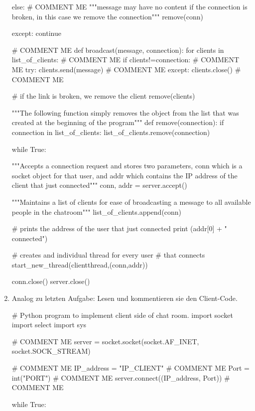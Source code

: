 \documentclass[paper=a4,fontsize=11pt]{scrartcl}%
\numberwithin{equation}{section}
\begin{document}
\begin{enumerate}
\begin{python}
                else: # COMMENT ME
                    """message may have no content if the connection
                    is broken, in this case we remove the connection"""
                    remove(conn)
 
            except:
                continue
 
# COMMENT ME
def broadcast(message, connection):
    for clients in list_of_clients: # COMMENT ME
        if clients!=connection: # COMMENT ME
            try:
                clients.send(message) # COMMENT ME
            except:
                clients.close() # COMMENT ME
 
                # if the link is broken, we remove the client
                remove(clients)
 
"""The following function simply removes the object
from the list that was created at the beginning of
the program"""
def remove(connection):
    if connection in list_of_clients:
        list_of_clients.remove(connection)
 
while True:
 
    """Accepts a connection request and stores two parameters,
    conn which is a socket object for that user, and addr
    which contains the IP address of the client that just
    connected"""
    conn, addr = server.accept()
 
    """Maintains a list of clients for ease of broadcasting
    a message to all available people in the chatroom"""
    list_of_clients.append(conn)
 
    # prints the address of the user that just connected
    print (addr[0] + " connected")
 
    # creates and individual thread for every user
    # that connects
    start_new_thread(clientthread,(conn,addr))    
 
conn.close()
server.close()
\end{python}
	\item Analog zu letzten Aufgabe: Lesen und kommentieren sie den Client-Code.
	\begin{python}
# Python program to implement client side of chat room.
import socket
import select
import sys

# COMMENT ME
server = socket.socket(socket.AF_INET, socket.SOCK_STREAM) 

# COMMENT ME
IP_address = "IP_CLIENT" # COMMENT ME
Port = int("PORT") # COMMENT ME
server.connect((IP_address, Port)) # COMMENT ME
 
while True:
 

\end{python}
\end{enumerate}
\end{document}
